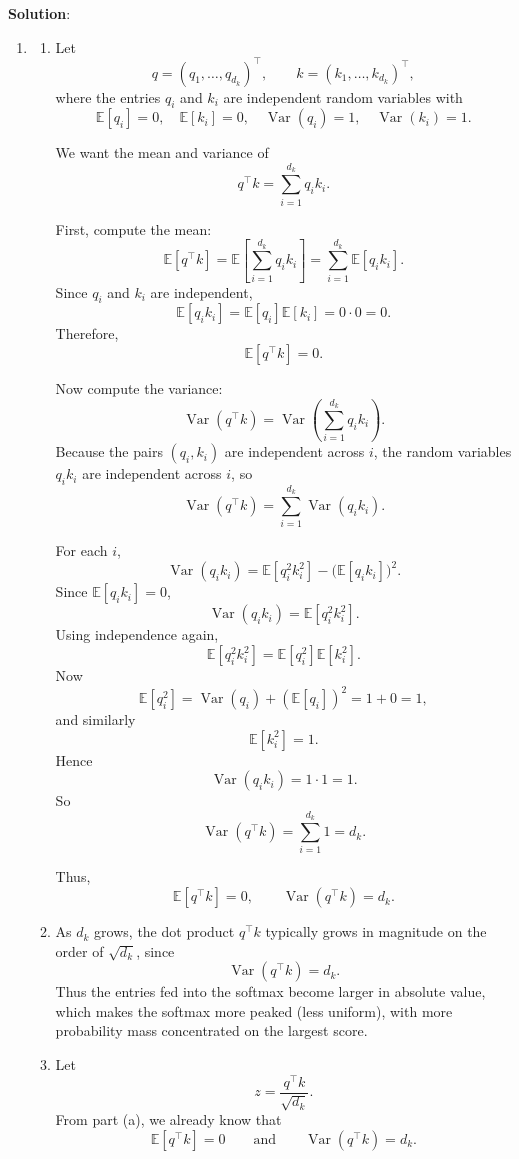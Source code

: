 \documentclass[submit]{harvardml}
\newenvironment{solution}{
    \vspace{2mm}
    \color{blue}\noindent\textbf{Solution}:
}{}
\begin{document}
\begin{solution}
\begin{enumerate}
\begin{enumerate}
Using decimal approximations,
\[
\frac{1}{\sqrt{2}} \approx 0.7071,\qquad \sqrt{2}\approx 1.4142,
\]
so
\[
A \approx
\begin{pmatrix}
0.3302 & 0.6698\\
0.3302 & 0.6698
\end{pmatrix}.
\]
	    \end{enumerate}
        \item \begin{enumerate}
            \item Let
\[
q = (q_1,\dots,q_{d_k})^\top, \qquad k = (k_1,\dots,k_{d_k})^\top,
\]
where the entries \(q_i\) and \(k_i\) are independent random variables with
\[
\mathbb{E}[q_i]=0,\quad \mathbb{E}[k_i]=0,\quad \operatorname{Var}(q_i)=1,\quad \operatorname{Var}(k_i)=1.
\]

We want the mean and variance of
\[
q^\top k = \sum_{i=1}^{d_k} q_i k_i.
\]

First, compute the mean:
\[
\mathbb{E}[q^\top k]
=
\mathbb{E}\!\left[\sum_{i=1}^{d_k} q_i k_i\right]
=
\sum_{i=1}^{d_k} \mathbb{E}[q_i k_i].
\]
Since \(q_i\) and \(k_i\) are independent,
\[
\mathbb{E}[q_i k_i] = \mathbb{E}[q_i]\mathbb{E}[k_i] = 0\cdot 0 = 0.
\]
Therefore,
\[
\mathbb{E}[q^\top k] = 0.
\]

Now compute the variance:
\[
\operatorname{Var}(q^\top k)
=
\operatorname{Var}\!\left(\sum_{i=1}^{d_k} q_i k_i\right).
\]
Because the pairs \((q_i,k_i)\) are independent across \(i\), the random variables \(q_i k_i\) are independent across \(i\), so
\[
\operatorname{Var}(q^\top k)
=
\sum_{i=1}^{d_k} \operatorname{Var}(q_i k_i).
\]

For each \(i\),
\[
\operatorname{Var}(q_i k_i)
=
\mathbb{E}[q_i^2 k_i^2] - \bigl(\mathbb{E}[q_i k_i]\bigr)^2.
\]
Since \(\mathbb{E}[q_i k_i]=0\),
\[
\operatorname{Var}(q_i k_i)=\mathbb{E}[q_i^2 k_i^2].
\]
Using independence again,
\[
\mathbb{E}[q_i^2 k_i^2] = \mathbb{E}[q_i^2]\mathbb{E}[k_i^2].
\]
Now
\[
\mathbb{E}[q_i^2] = \operatorname{Var}(q_i) + (\mathbb{E}[q_i])^2 = 1+0=1,
\]
and similarly
\[
\mathbb{E}[k_i^2]=1.
\]
Hence
\[
\operatorname{Var}(q_i k_i)=1\cdot 1=1.
\]
So
\[
\operatorname{Var}(q^\top k)=\sum_{i=1}^{d_k} 1 = d_k.
\]

Thus,
\[
\boxed{\mathbb{E}[q^\top k]=0,\qquad \operatorname{Var}(q^\top k)=d_k.}
\]
\item As \(d_k\) grows, the dot product \(q^\top k\) typically grows in magnitude on the order of \(\sqrt{d_k}\), since
\[
\operatorname{Var}(q^\top k)=d_k.
\]
Thus the entries fed into the softmax become larger in absolute value, which makes the softmax more peaked (less uniform), with more probability mass concentrated on the largest score.
\item Let
\[
z=\frac{q^\top k}{\sqrt{d_k}}.
\]
From part (a), we already know that
\[
\mathbb{E}[q^\top k]=0
\qquad\text{and}\qquad
\operatorname{Var}(q^\top k)=d_k.
\]


\end{enumerate}
\end{enumerate}
\end{solution}
\end{document}
